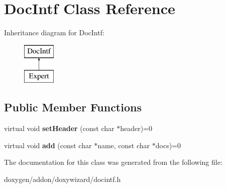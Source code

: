 \hypertarget{class_doc_intf}{}\section{Doc\+Intf Class Reference}
\label{class_doc_intf}
Inheritance diagram for Doc\+Intf\+:\begin{figure}[H]
\begin{center}
\leavevmode
\includegraphics[height=2.000000cm]{class_doc_intf}
\end{center}
\end{figure}
\subsection*{Public Member Functions}
\begin{DoxyCompactItemize}
\item 
\mbox{\label{class_doc_intf_a08907a4f62bca8c03225f74cc9050482}} 
virtual void {\bfseries set\+Header} (const char $\ast$header)=0
\item 
\mbox{\label{class_doc_intf_a6531ead31efb735e73b85f3e0bf7be41}} 
virtual void {\bfseries add} (const char $\ast$name, const char $\ast$docs)=0
\end{DoxyCompactItemize}


The documentation for this class was generated from the following file\+:\begin{DoxyCompactItemize}
\item 
doxygen/addon/doxywizard/docintf.\+h\end{DoxyCompactItemize}
